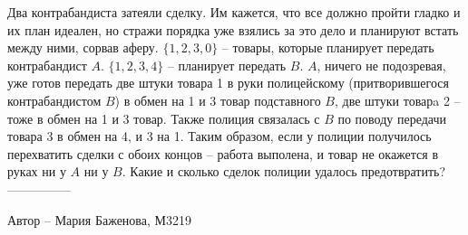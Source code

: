\question
Два контрабандиста затеяли сделку. Им кажется, что все должно пройти гладко и их план идеален, но стражи порядка уже взялись за это дело и планируют встать между ними, сорвав аферу. $\{1, 2, 3, 0\}$ – товары, которые планирует передать контрабандист $A$. $\{1, 2, 3, 4\}$ – планирует передать $B$. $A$, ничего не подозревая, уже готов передать две штуки товара 1 в руки полицейскому (притворившегося контрабандистом $B$) в обмен на 1 и 3 товар подставного $B$, две штуки товарa 2 – тоже в обмен на 1 и 3 товар. Также полиция связалась с $B$ по поводу передачи товара 3 в обмен на 4, и 3 на 1. Таким образом, если у полиции получилось перехватить сделки с обоих концов – работа выполена, и товар не окажется в руках ни у $A$ ни у $B$. Какие и сколько сделок полиции удалось предотвратить?
\\
---------------

Автор -- Мария Баженова, М3219